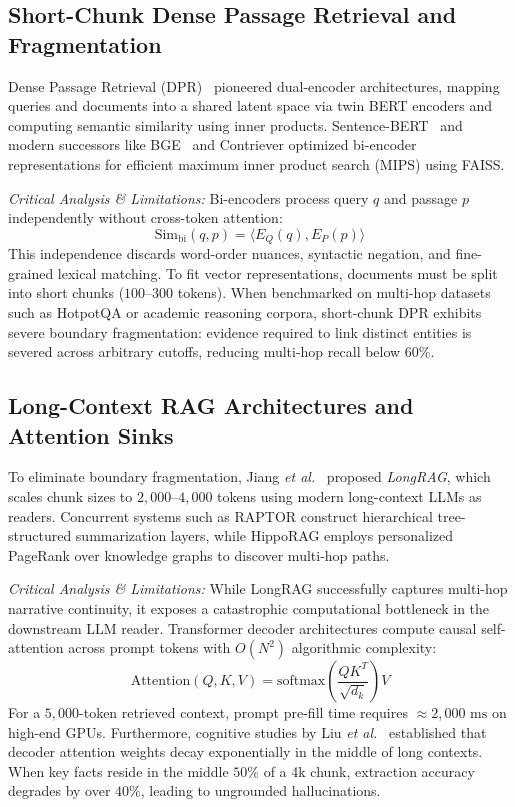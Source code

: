 \documentclass[lettersize,journal]{IEEEtran}
\begin{document}
\subsection{Short-Chunk Dense Passage Retrieval and Fragmentation}
Dense Passage Retrieval (DPR)~\cite{sbert} pioneered dual-encoder architectures, mapping queries and documents into a shared latent space via twin BERT encoders and computing semantic similarity using inner products. Sentence-BERT~\cite{sbert} and modern successors like BGE~\cite{bge} and Contriever optimized bi-encoder representations for efficient maximum inner product search (MIPS) using FAISS.

\textit{Critical Analysis \& Limitations:} Bi-encoders process query $q$ and passage $p$ independently without cross-token attention:
\begin{equation}
\label{eq:biencoder}
\text{Sim}_{\text{bi}}(q, p) = \langle E_Q(q), E_P(p) \rangle
\end{equation}
This independence discards word-order nuances, syntactic negation, and fine-grained lexical matching. To fit vector representations, documents must be split into short chunks ($100$--$300$ tokens). When benchmarked on multi-hop datasets such as HotpotQA or academic reasoning corpora, short-chunk DPR exhibits severe boundary fragmentation: evidence required to link distinct entities is severed across arbitrary cutoffs, reducing multi-hop recall below $60\%$.

\subsection{Long-Context RAG Architectures and Attention Sinks}
To eliminate boundary fragmentation, Jiang \textit{et al.}~\cite{longrag} proposed \textit{LongRAG}, which scales chunk sizes to $2,000$--$4,000$ tokens using modern long-context LLMs as readers. Concurrent systems such as RAPTOR construct hierarchical tree-structured summarization layers, while HippoRAG employs personalized PageRank over knowledge graphs to discover multi-hop paths.

\textit{Critical Analysis \& Limitations:} While LongRAG successfully captures multi-hop narrative continuity, it exposes a catastrophic computational bottleneck in the downstream LLM reader. Transformer decoder architectures compute causal self-attention across prompt tokens with $O(N^2)$ algorithmic complexity:
\begin{equation}
\label{eq:attention}
\text{Attention}(Q, K, V) = \text{softmax}\left( \frac{QK^T}{\sqrt{d_k}} \right) V
\end{equation}
For a $5,000$-token retrieved context, prompt pre-fill time requires $\approx 2,000\text{ ms}$ on high-end GPUs. Furthermore, cognitive studies by Liu \textit{et al.}~\cite{lostinmiddle} established that decoder attention weights decay exponentially in the middle of long contexts. When key facts reside in the middle $50\%$ of a 4k chunk, extraction accuracy degrades by over $40\%$, leading to ungrounded hallucinations.
\end{document}
